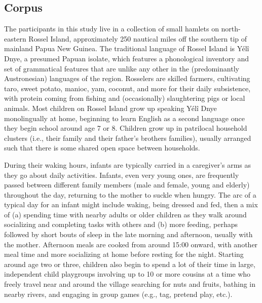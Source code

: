 \documentclass[,man,floatsintext]{apa6}
\begin{document}
\subsection{Corpus}\label{methods-dataset}

The participants in this study live in a collection of small hamlets on
north-eastern Rossel Island, approximately 250 nautical miles off the
southern tip of mainland Papua New Guinea. The traditional language of
Rossel Island is Yélî Dnye, a presumed Papuan isolate, which features a
phonological inventory and set of grammatical features that are unlike
any other in the (predominantly Austronesian) languages of the region.
Rosselers are skilled farmers, cultivating taro, sweet potato, manioc,
yam, coconut, and more for their daily subsistence, with protein coming
from fishing and (occasionally) slaughtering pigs or local animals. Most
children on Rossel Island grow up speaking Yélî Dnye monolingually at
home, beginning to learn English as a second language once they begin
school around age 7 or 8. Children grow up in patrilocal household
clusters (i.e., their family and their father's brothers families),
usually arranged such that there is some shared open space between
households.

During their waking hours, infants are typically carried in a
caregiver's arms as they go about daily activities. Infants, even very
young ones, are frequently passed between different family members (male
and female, young and elderly) throughout the day, returning to the
mother to suckle when hungry. The arc of a typical day for an infant
might include waking, being dressed and fed, then a mix of (a) spending
time with nearby adults or older children as they walk around
socializing and completing tasks with others and (b) more feeding,
perhaps followed by short bouts of sleep in the late morning and
afternoon, usually with the mother. Afternoon meals are cooked from
around 15:00 onward, with another meal time and more socializing at home
before resting for the night. Starting around age two or three, children
also begin to spend a lot of their time in large, independent child
playgroups involving up to 10 or more cousins at a time who freely
travel near and around the village searching for nuts and fruits,
bathing in nearby rivers, and engaging in group games (e.g., tag,
pretend play, etc.).
\end{document}
